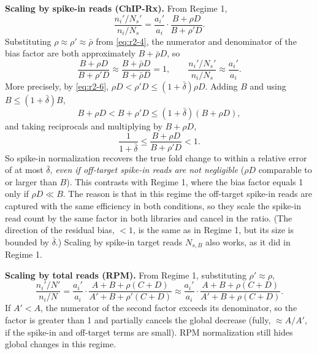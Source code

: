\textbf{Scaling by spike-in reads (ChIP-Rx).} From Regime 1,
$$
\frac{n_i'/N_s'}{n_i/N_s}
=\frac{a_i'}{a_i}\cdot\frac{B+\rho D}{B+\rho' D}.
$$
Substituting $\rho\approx\rho'\approx\bar\rho$ from \eqref{eq:r2-4}, the
numerator and denominator of the bias factor are both approximately
$B+\bar\rho D$, so
$$
\frac{B+\rho D}{B+\rho' D}\approx\frac{B+\bar\rho D}{B+\bar\rho D}=1,
\qquad
\frac{n_i'/N_s'}{n_i/N_s}\approx\frac{a_i'}{a_i}.
$$
More precisely, by \eqref{eq:r2-6}, $\rho D<\rho' D\le(1+\bar\delta)\rho D$.
Adding $B$ and using $B\le(1+\bar\delta)B$,
$$
B+\rho D<B+\rho' D\le(1+\bar\delta)(B+\rho D),
$$
and taking reciprocals and multiplying by $B+\rho D$,
$$
\frac{1}{1+\bar\delta}\le\frac{B+\rho D}{B+\rho' D}<1.
$$
So spike-in normalization recovers the true fold change to within a
relative error of at most $\bar\delta$, \emph{even if off-target spike-in
reads are not negligible} ($\rho D$ comparable to or larger than $B$).
This contrasts with Regime 1, where the bias factor equals 1 only if
$\rho D\ll B$. The reason is that in this regime the off-target spike-in
reads are captured with the same efficiency in both conditions, so they
scale the spike-in read count by the same factor in both libraries and
cancel in the ratio. (The direction of the residual bias, $<1$, is the
same as in Regime 1, but its size is bounded by $\bar\delta$.) Scaling by
spike-in target reads $N_{s,B}$ also works, as it did in Regime 1.

\textbf{Scaling by total reads (RPM).} From Regime 1, substituting
$\rho'\approx\rho$,
$$
\frac{n_i'/N'}{n_i/N}
=\frac{a_i'}{a_i}\cdot\frac{A+B+\rho(C+D)}{A'+B+\rho'(C+D)}
\approx\frac{a_i'}{a_i}\cdot\frac{A+B+\rho(C+D)}{A'+B+\rho(C+D)}.
$$
If $A'<A$, the numerator of the second factor exceeds its denominator, so
the factor is greater than 1 and partially cancels the global decrease
(fully, $\approx A/A'$, if the spike-in and off-target terms are small).
RPM normalization still hides global changes in this regime.

